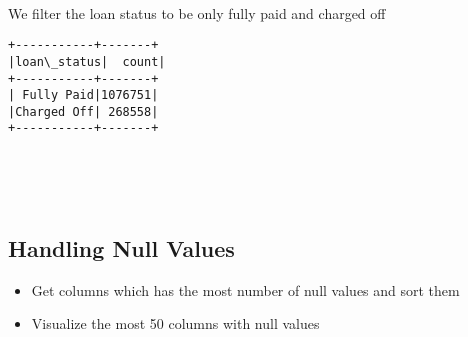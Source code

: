 \documentclass[11pt]{article}
\providecommand{\tightlist}{%
      \setlength{\itemsep}{0pt}\setlength{\parskip}{0pt}}
\begin{document}
    \begin{center}
    \end{center}
    { \hspace*{\fill} \\}
    
    We filter the loan status to be only fully paid and charged off

    \begin{Verbatim}[commandchars=\\\{\}]
+-----------+-------+
|loan\_status|  count|
+-----------+-------+
| Fully Paid|1076751|
|Charged Off| 268558|
+-----------+-------+

    \end{Verbatim}

    \begin{center}
    \end{center}
    { \hspace*{\fill} \\}
    
    \begin{center}
    \end{center}
    { \hspace*{\fill} \\}
    
    \hypertarget{handling-null-values}{%
\subsection{Handling Null Values}\label{handling-null-values}}

\begin{itemize}
\tightlist
\item
  Get columns which has the most number of null values and sort them
\end{itemize}

    \begin{itemize}
\tightlist
\item
  Visualize the most 50 columns with null values
\end{itemize}

    \begin{center}
    \end{center}
    { \hspace*{\fill} \\}
    
\end{document}
